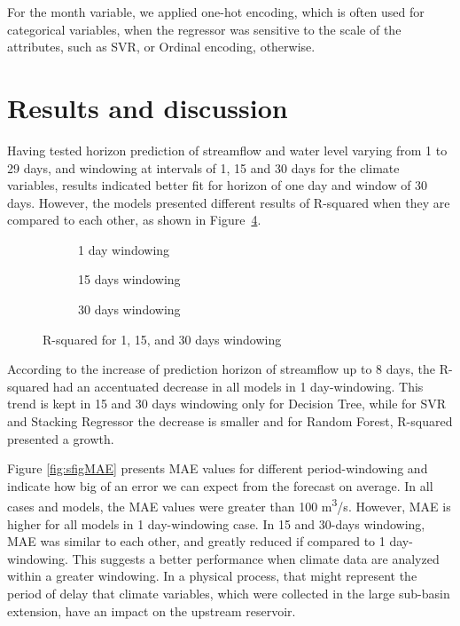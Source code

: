 \documentclass[12pt]{article}
\begin{document}
For the month variable, we applied one-hot encoding, which is often used for categorical variables, when the regressor was sensitive to the scale of the attributes, such as SVR, or Ordinal encoding, otherwise.

\section{Results and discussion}
\label{sec:ResultsDiscussion}

Having tested horizon prediction of streamflow and water level varying from 1 to 29 days, and windowing at intervals of 1, 15 and 30 days for the climate variables, results indicated better fit for horizon of one day and window of 30 days. However, the models presented different results of R-squared when they are compared to each other, as shown in Figure~\ref{fig:r2}.

\begin{figure}[htb]
    \centering
    \begin{subfigure}[b]{.49\textwidth}
        \centering
        
        \caption{1 day windowing}
        \label{fig:r2_1}
    \end{subfigure}
    \begin{subfigure}[b]{.49\textwidth}
        \centering
        
        \caption{15 days windowing}
        \label{fig:r2_15}
    \end{subfigure}
    \begin{subfigure}[b]{\textwidth}
        \centering
        
        \captionsetup{justification=justified,singlelinecheck=false}
        \caption{30 days windowing}
        \label{fig:r2_30}
    \end{subfigure}
    \caption{R-squared for  1,  15, and  30 days windowing}
    \label{fig:r2}
\end{figure}

According to the increase of prediction horizon of streamflow up to 8 days, the R-squared had an accentuated decrease in all models in 1 day-windowing. This trend is kept in 15 and 30 days windowing only for Decision Tree, while for SVR and Stacking Regressor the decrease is smaller and for Random Forest, R-squared presented a growth.

Figure \ref{fig:sfigMAE} presents MAE values for different period-windowing and indicate how big of an error we can expect from the forecast on average. In all cases and models, the MAE values were greater than 100 m\textsuperscript{3}/s. However, MAE is higher for all models in 1 day-windowing case. In 15 and 30-days windowing, MAE was similar to each other, and greatly reduced if compared to 1 day-windowing. This suggests a better performance when climate data are analyzed within a greater windowing. In a physical process, that might represent the period of delay that climate variables, which were collected in the large sub-basin extension, have an impact on the upstream reservoir.
\end{document}
